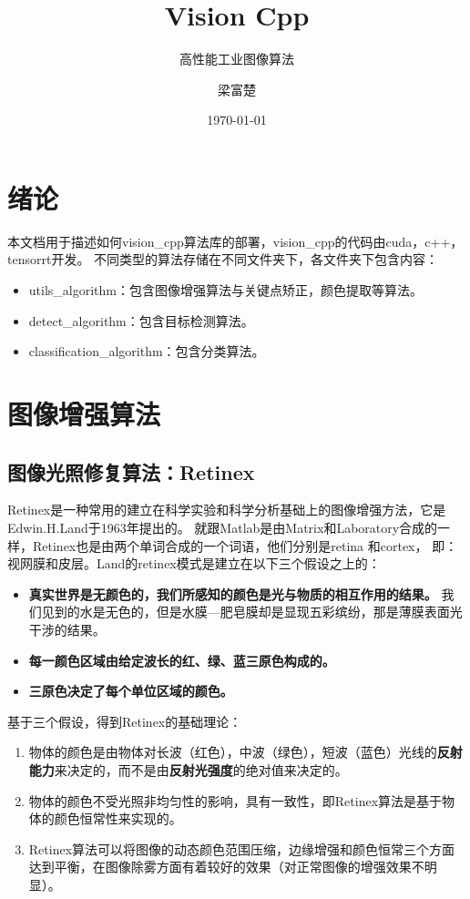 \documentclass[lang=cn,newtx,10pt,scheme=chinese]{elegantbook}
\title{Vision Cpp}
\subtitle{高性能工业图像算法}
\author{梁富楚}
\institute{}
\date{\today}
\begin{document}
    \maketitle
    \frontmatter

    \tableofcontents

    \mainmatter


    \chapter{绪论}
    本文档用于描述如何vision\_cpp算法库的部署，vision\_cpp的代码由cuda，c++，tensorrt开发。
    不同类型的算法存储在不同文件夹下，各文件夹下包含内容：
    \begin{itemize}
        \item utils\_algorithm：包含图像增强算法与关键点矫正，颜色提取等算法。
        \item detect\_algorithm：包含目标检测算法。
        \item classification\_algorithm：包含分类算法。
    \end{itemize}


    \chapter{图像增强算法}


    \section{图像光照修复算法：Retinex}
    Retinex是一种常用的建立在科学实验和科学分析基础上的图像增强方法，它是Edwin.H.Land于1963年提出的。
    就跟Matlab是由Matrix和Laboratory合成的一样，Retinex也是由两个单词合成的一个词语，他们分别是retina 和cortex，
    即：视网膜和皮层。Land的retinex模式是建立在以下三个假设之上的：
    \begin{itemize}
        \item \textbf{真实世界是无颜色的，我们所感知的颜色是光与物质的相互作用的结果。}
        我们见到的水是无色的，但是水膜—肥皂膜却是显现五彩缤纷，那是薄膜表面光干涉的结果。
        \item \textbf{每一颜色区域由给定波长的红、绿、蓝三原色构成的。}
        \item \textbf{三原色决定了每个单位区域的颜色。}
    \end{itemize}
    基于三个假设，得到Retinex的基础理论：
    \begin{enumerate}
        \item 物体的颜色是由物体对长波（红色），中波（绿色），短波（蓝色）光线的\textbf{反射能力}来决定的，而不是由\textbf{反射光强度}的绝对值来决定的。
        \item 物体的颜色不受光照非均匀性的影响，具有一致性，即Retinex算法是基于物体的颜色恒常性来实现的。
        \item Retinex算法可以将图像的动态颜色范围压缩，边缘增强和颜色恒常三个方面达到平衡，在图像除雾方面有着较好的效果（对正常图像的增强效果不明显）。
    \end{enumerate}
\end{document}
